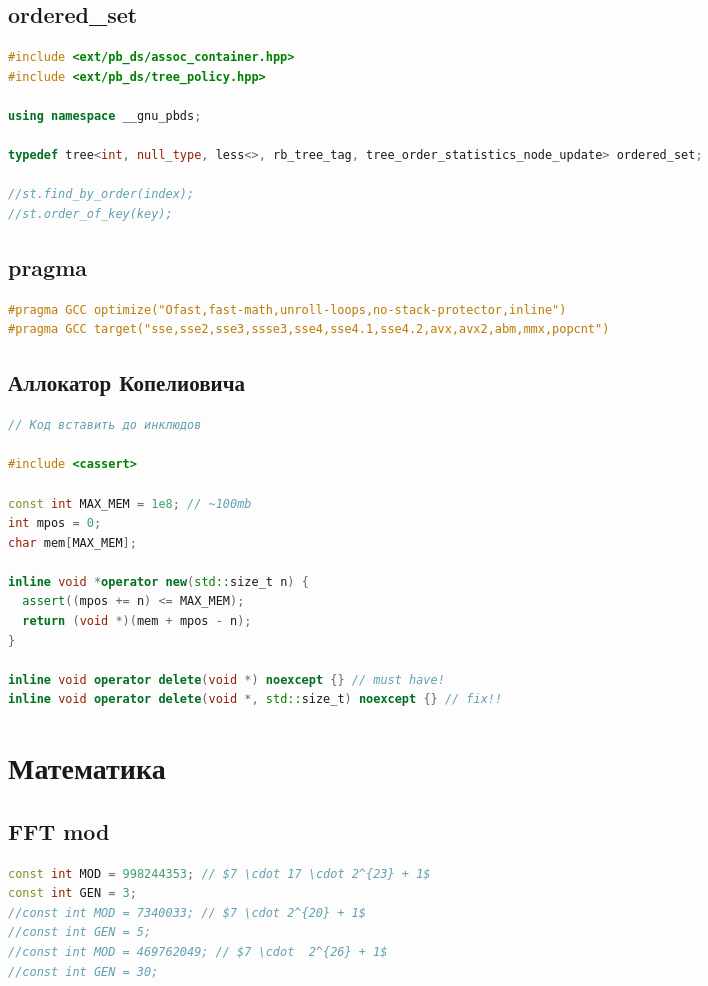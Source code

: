 \documentclass[10pt,a4paper,landscape,twosided]{extarticle}
\begin{document}
\begin{multicols*}{3}
\subsection{ordered\_set}
\begin{lstlisting}[language=C++]
#include <ext/pb_ds/assoc_container.hpp>
#include <ext/pb_ds/tree_policy.hpp>

using namespace __gnu_pbds;

typedef tree<int, null_type, less<>, rb_tree_tag, tree_order_statistics_node_update> ordered_set;

//st.find_by_order(index);
//st.order_of_key(key);

\end{lstlisting}

\subsection{pragma}
\begin{lstlisting}[language=C++]
#pragma GCC optimize("Ofast,fast-math,unroll-loops,no-stack-protector,inline")
#pragma GCC target("sse,sse2,sse3,ssse3,sse4,sse4.1,sse4.2,avx,avx2,abm,mmx,popcnt")

\end{lstlisting}

\subsection{Аллокатор Копелиовича}
\begin{lstlisting}[language=C++]
// Код вставить до инклюдов

#include <cassert>

const int MAX_MEM = 1e8; // ~100mb
int mpos = 0;
char mem[MAX_MEM];

inline void *operator new(std::size_t n) {
  assert((mpos += n) <= MAX_MEM);
  return (void *)(mem + mpos - n);
}

inline void operator delete(void *) noexcept {} // must have!
inline void operator delete(void *, std::size_t) noexcept {} // fix!!
\end{lstlisting}

\section{Математика}

\subsection{FFT mod}
\begin{lstlisting}[language=C++]
const int MOD = 998244353; // $7 \cdot 17 \cdot 2^{23} + 1$
const int GEN = 3;
//const int MOD = 7340033; // $7 \cdot 2^{20} + 1$
//const int GEN = 5;
//const int MOD = 469762049; // $7 \cdot  2^{26} + 1$
//const int GEN = 30;


\end{lstlisting}
\end{multicols*}
\end{document}
